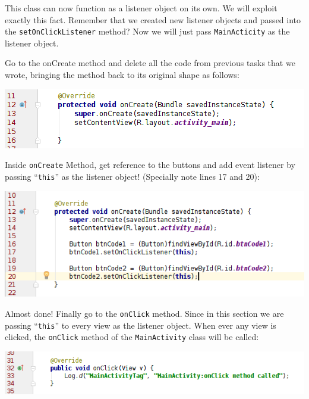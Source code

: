 This class can now function as a listener object on its own. We will exploit exactly this fact. Remember that we created new listener objects and passed into the \texttt{setOnClickListener} method? Now we will just pass \texttt{MainActicity} as the listener object.

Go to the onCreate method and delete all the code from previous tasks that we wrote, bringing the method back to its original shape as follows:

\begin{center}
	\includegraphics[scale=0.4]{chapters/ch05/images/12}
\end{center}

Inside \texttt{onCreate} Method, get reference to the buttons and add event listener by passing ``\texttt{this}'' as the listener object! (Specially note lines 17 and 20):

\begin{center}
	\includegraphics[scale=0.4]{chapters/ch05/images/13}
\end{center}

Almost done! Finally go to the \texttt{onClick} method. Since in this section we are passing ``\texttt{this}'' to every view as the listener object. When ever any view is clicked, the \texttt{onClick} method of the \texttt{MainActivity} class will be called: 

\begin{center}
	\includegraphics[scale=0.4]{chapters/ch05/images/14}
\end{center}

